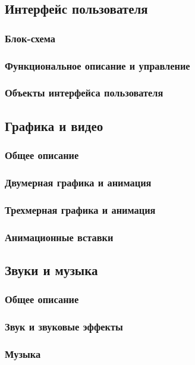 \documentclass{article}
\begin{document}
\subsection{Интерфейс пользователя}

\subsubsection{Блок-схема}
\subsubsection{Функциональное описание и управление}
\subsubsection{Объекты интерфейса пользователя}

\subsection{Графика и видео}

\subsubsection{Общее описание}
\subsubsection{Двумерная графика и анимация}
\subsubsection{Трехмерная графика и анимация}
\subsubsection{Анимационные вставки}

\subsection{Звуки и музыка}
\subsubsection{Общее описание}
\subsubsection{Звук и звуковые эффекты}
\subsubsection{Музыка}
\end{document}

